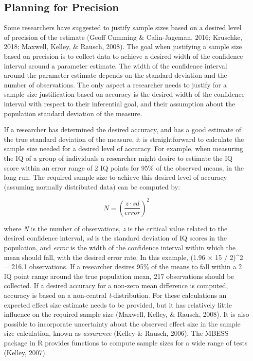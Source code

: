 \documentclass[
  english,
  ,jou, a4paper,floatsintext]{apa6}
\begin{document}
\hypertarget{planning-for-precision}{%
\subsection{Planning for Precision}\label{planning-for-precision}}

Some researchers have suggested to justify sample sizes based on a desired level of precision of the estimate (Geoff Cumming \& Calin-Jageman, 2016; Kruschke, 2018; Maxwell, Kelley, \& Rausch, 2008). The goal when justifying a sample size based on precision is to collect data to achieve a desired width of the confidence interval around a parameter estimate. The width of the confidence interval around the parameter estimate depends on the standard deviation and the number of observations. The only aspect a researcher needs to justify for a sample size justification based on accuracy is the desired width of the confidence interval with respect to their inferential goal, and their assumption about the population standard deviation of the measure.

If a researcher has determined the desired accuracy, and has a good estimate of the true standard deviation of the measure, it is straightforward to calculate the sample size needed for a desired level of accuracy. For example, when measuring the IQ of a group of individuals a researcher might desire to estimate the IQ score within an error range of 2 IQ points for 95\% of the observed means, in the long run. The required sample size to achieve this desired level of accuracy (assuming normally distributed data) can be computed by:

\[N = \left(\frac{z \cdot sd}{error}\right)^2\]

where \emph{N} is the number of observations, \emph{z} is the critical value related to the desired confidence interval, \emph{sd} is the standard deviation of IQ scores in the population, and \emph{error} is the width of the confidence interval within which the mean should fall, with the desired error rate. In this example, (1.96 × 15 / 2)\^{}2 = 216.1 observations. If a researcher desires 95\% of the means to fall within a 2 IQ point range around the true population mean, 217 observations should be collected. If a desired accuracy for a non-zero mean difference is computed, accuracy is based on a non-central \emph{t}-distribution. For these calculations an expected effect size estimate needs to be provided, but it has relatively little influence on the required sample size (Maxwell, Kelley, \& Rausch, 2008). It is also possible to incorporate uncertainty about the observed effect size in the sample size calculation, known as \emph{assurance} (Kelley \& Rausch, 2006). The MBESS package in R provides functions to compute sample sizes for a wide range of tests (Kelley, 2007).
\end{document}
